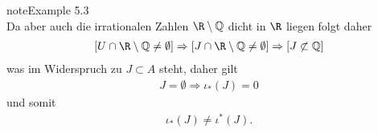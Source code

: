 \documentclass[letterpaper,10pt,german]{jupyterBook}
\begin{document}
\begin{sphinxadmonition}{note}{Example 5.3}
\begin{equation*}
\end{equation*}
\sphinxAtStartPar
Da aber auch die irrationalen Zahlen \(\R\setminus \mathbb{Q}\) dicht in \(\R\) liegen folgt daher
\begin{equation*}
\begin{split}\left[U\cap\R\setminus \mathbb{Q} \neq \emptyset\right] 
\Rightarrow 
\left[J \cap \R\setminus \mathbb{Q} \neq \emptyset\right]
\Rightarrow 
\left[J\not\subset \mathbb{Q}\right]\end{split}
\end{equation*}
\sphinxAtStartPar
was im Widerspruch zu \(J\subset A\) steht, daher gilt
\begin{equation*}
\begin{split}J=\emptyset\Rightarrow \iota_\ast(J) = 0\end{split}
\end{equation*}
\sphinxAtStartPar
und somit
\begin{equation*}
\begin{split}\iota_\ast(J) \neq \iota^\ast(J).\end{split}
\end{equation*}\end{sphinxadmonition}
\end{document}
